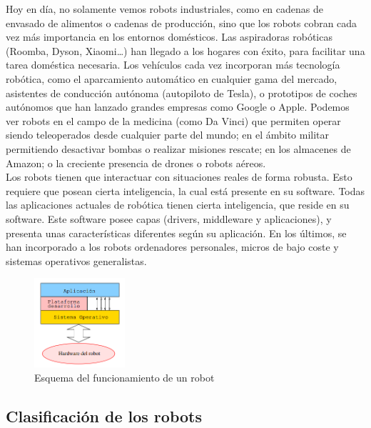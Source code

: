 Hoy en día, no solamente vemos robots industriales, como en cadenas de envasado de alimentos o cadenas de producción, sino que los robots cobran cada vez más importancia en los entornos domésticos. Las aspiradoras robóticas (Roomba, Dyson, Xiaomi…) han llegado a los hogares con éxito, para facilitar una tarea doméstica necesaria. Los vehículos cada vez incorporan más tecnología robótica, como el aparcamiento automático en cualquier gama del mercado, asistentes de conducción autónoma (autopiloto de Tesla), o prototipos de coches autónomos que han lanzado grandes empresas como Google o Apple. Podemos ver robots en el campo de la medicina (como Da Vinci) que permiten operar siendo teleoperados desde cualquier parte del mundo; en el ámbito militar permitiendo desactivar bombas o realizar misiones rescate; en los almacenes de Amazon; o la creciente presencia de drones o robots aéreos.\\

Los robots tienen que interactuar con situaciones reales de forma robusta. Esto requiere que posean cierta inteligencia, la cual está presente en su software. Todas las aplicaciones actuales de robótica tienen cierta inteligencia, que reside en su software. Este software posee capas (drivers, middleware y aplicaciones), y presenta unas características diferentes según su aplicación. En los últimos, se han incorporado a los robots ordenadores personales, micros de bajo coste y sistemas operativos generalistas.

\begin{figure}[H]
  \begin{center}
    \includegraphics[width=0.3\textwidth]{figures/Introduccion/Esquema_Robot.png}
		\caption{Esquema del funcionamiento de un robot}
		\label{fig.Esquema_Robot}
		\end{center}
\end{figure}

\subsection{Clasificación de los robots}

